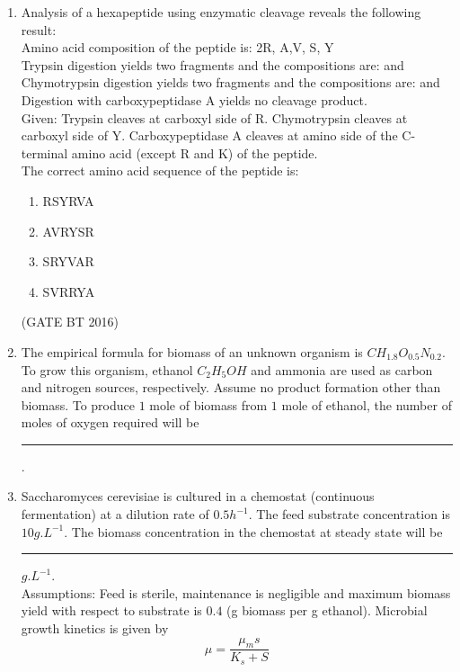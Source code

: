 \documentclass[journal,12pt,onecolumn]{IEEEtran}
\theoremstyle{remark}
\begin{document}
\begin{enumerate}
\item Analysis of a hexapeptide using enzymatic cleavage reveals the following result:\\

\textbullet Amino acid composition of the peptide is: 2R, A,V, S, Y\\
\textbullet  Trypsin digestion yields two fragments and the compositions are:  and \\
\textbullet  Chymotrypsin digestion yields two fragments and the compositions are:  and \\
\textbullet Digestion with carboxypeptidase A yields no cleavage product.\\

Given:	Trypsin cleaves at carboxyl side of R. Chymotrypsin cleaves at carboxyl side of Y.
Carboxypeptidase A cleaves at amino side of the C-terminal amino acid (except R and K) of the peptide.\\
The correct amino acid sequence of the peptide is:
\begin{multicols}{4}
\begin{enumerate}
\item RSYRVA	
\item AVRYSR	
\item SRYVAR	
\item SVRRYA
\end{enumerate}
\end{multicols} \hfill(GATE BT 2016)  

\item  The empirical formula for biomass of an unknown organism is $CH_{1.8}O_{0.5}N_{0.2}$. To grow this organism, ethanol $C_{2}H_{5}OH$ and ammonia are used as carbon and nitrogen sources, respectively. Assume no product formation other than biomass. To produce $1$ mole of biomass from $1$ mole of ethanol, the number of moles of oxygen required will be \rule{2cm}{0.4pt}.


\item  Saccharomyces cerevisiae is cultured in a chemostat (continuous fermentation) at a dilution rate of
$0.5 h^{-1}$. The feed substrate concentration is $10 g.L^{-1}$. The biomass concentration in the chemostat at steady state will be  \rule{2cm}{0.4pt} $g.L^{-1}$.\\
Assumptions: Feed is sterile, maintenance is negligible and maximum biomass yield with respect to substrate is $0.4$ (g biomass per g ethanol).
Microbial growth kinetics is given by \[ \mu = \frac{\mu_m s}{K_s+S}\]


\end{enumerate}
\end{document}
